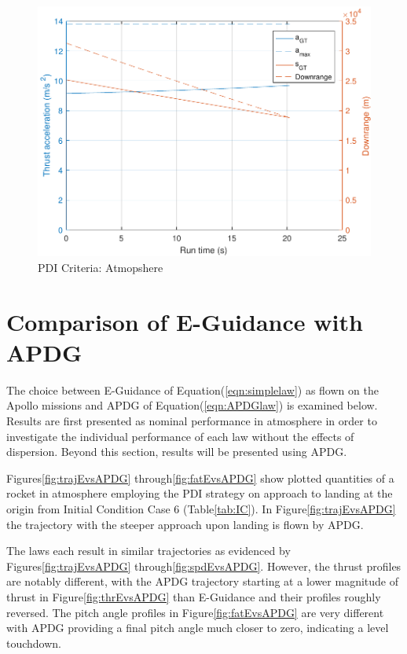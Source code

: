 \begin{figure}[H]
	\centering
	\begin{minipage}{4.3 in}
		\includegraphics[width=\linewidth]{Figures/gtcriteriaatmo.pdf}
		\caption{PDI Criteria: Atmopshere \label{fig:gtcriteriaatmo} }
	\end{minipage}
\end{figure}


\section{Comparison of E-Guidance with APDG} \label{sec:lawcomp}

The choice between E-Guidance of Equation\:(\ref{eqn:simplelaw}) as flown on the Apollo missions and APDG of Equation\:(\ref{eqn:APDGlaw}) is examined below. Results are first presented as nominal performance in atmosphere in order to investigate the individual performance of each law without the effects of dispersion. Beyond this section, results will be presented using APDG.

Figures\:\ref{fig:trajEvsAPDG} through\:\ref{fig:fatEvsAPDG} show plotted quantities of a rocket in atmosphere employing the PDI strategy on approach to landing at the origin from Initial Condition Case 6 (Table\:\ref{tab:IC}). In Figure\:\ref{fig:trajEvsAPDG} the trajectory with the steeper approach upon landing is flown by APDG. 

The laws each result in similar trajectories as evidenced by Figures\:\ref{fig:trajEvsAPDG} through\:\ref{fig:spdEvsAPDG}. However, the thrust profiles are notably different, with the APDG trajectory starting at a lower magnitude of thrust in Figure\:\ref{fig:thrEvsAPDG} than E-Guidance and their profiles roughly reversed. The pitch angle profiles in Figure\:\ref{fig:fatEvsAPDG} are very different with APDG providing a final pitch angle much closer to zero, indicating a level touchdown.

